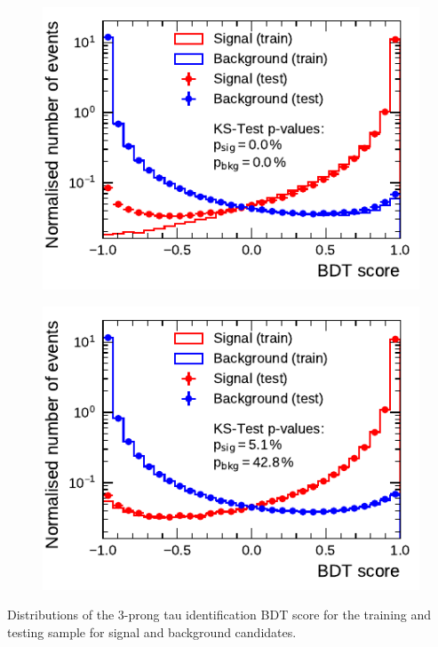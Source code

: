 \noindent
\begin{minipage}{\textwidth}
  \captionsetup{type=figure}
  \begin{subfigure}[t]{0.48\textwidth}
    \centering
    \includegraphics{./figures/bdt_perf/scores/grid_3p0317.pdf}
  \end{subfigure}\hfill
  \begin{subfigure}[t]{0.48\textwidth}
    \centering
    \includegraphics{./figures/bdt_perf/scores/grid_3p0327.pdf}
  \end{subfigure}
  \caption[Distributions of the tau identification BDT score
  (3-prong)]{Distributions of the 3-prong tau identification BDT score for the
    training and testing sample for signal and background candidates.}
  \label{fig:bdt_ks5_scores}
\end{minipage}

